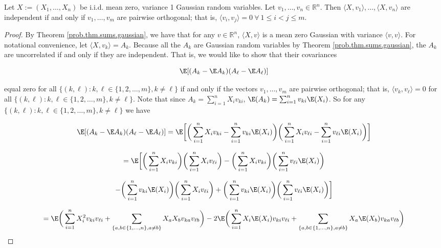 \begin{lemma}\label{stats.hw3.ex.3.16} Let \(X := (X_1, \ldots, X_n)\) be i.i.d. mean zero, variance 1 Gaussian random variables. Let \(v_1, \ldots, v_n \in \mathbb{R}^n\). Then \(\langle X, v_1 \rangle, \ldots, \langle X, v_n \rangle\) are independent if and only if \(v_1, \ldots, v_m \) are pairwise orthogonal; that is,  \(\langle v_i, v_j \rangle = 0 \ \forall \ 1 \leq i < j \leq m\). 

\end{lemma}

\begin{proof} By Theorem \ref{prob.thm.sums.gaussian}, we have that for any $v\in\mathbb{R}^{n}$, $\langle X, v\rangle$ is a mean zero Gaussian with variance $\langle v,v\rangle$. For notational convenience, let \(\langle X, v_k \rangle = A_k\). Because all the \( A_k \) are Gaussian random variables by Theorem \ref{prob.thm.sums.gaussian}, the \(A_k\) are uncorrelated if and only if they are independent. That is, we would like to show that their covariances


\[
\E[(A_k - \E A_k)(A_\ell - \E A_\ell)] 
\]

equal zero for all \( \{(k, \ell) : k, \ell \in \{1, 2, \ldots, m\}, k \neq \ell \}\) if and only if the vectors $v_1,\dots,v_m$ are pairwise orthogonal; that is, \(\langle v_k, v_\ell \rangle = 0 \) for all \( \{(k, \ell) : k, \ell \in \{1, 2, \ldots, m\}, k \neq \ell \}\). Note that since \(A_k = \sum_{i=1}^n X_i v_{ki}\), \(\E (A_k) =   \sum_{i=1}^n  v_{ki} \E(X_i)\). So for any \( \{(k, \ell) : k, \ell \in \{1, 2, \ldots, m\}, k \neq \ell \}\) we have

\[
\E[(A_k - \E A_k)(A_\ell - \E A_\ell)] = \E \bigg[ \bigg( \sum_{i=1}^n X_i v_{ki} -   \sum_{i=1}^n  v_{ki} \E(X_i) \bigg) \bigg(\sum_{i=1}^n X_i v_{\ell i} -   \sum_{i=1}^n  v_{\ell i} \E(X_i) \bigg) \bigg] 
\]

\[
= \E \bigg[ \bigg( \sum_{i=1}^n X_i v_{ki} \bigg)  \bigg(\sum_{i=1}^n X_i v_{\ell i} \bigg) -  \bigg( \sum_{i=1}^n X_i v_{ki} \bigg) \bigg( \sum_{i=1}^n  v_{\ell i} \E(X_i) \bigg)   
\]

\[
-   \bigg( \sum_{i=1}^n  v_{ki} \E(X_i) \bigg) \bigg(\sum_{i=1}^n X_i v_{\ell i} \bigg)  +    \bigg( \sum_{i=1}^n  v_{ki} \E(X_i) \bigg)  \bigg(  \sum_{i=1}^n  v_{\ell i} \E(X_i) \bigg) \bigg] 
\]




\[
= \E \bigg(  \sum_{i=1}^n X_i^2 v_{ki} v_{\ell i} + \sum_{\{a, b \in \{1, \ldots, n\}, a \neq b \} }   X_a X_b v_{ka}  v_{\ell b}\bigg)
-  2 \E \bigg(  \sum_{i=1}^n X_i \E(X_i) v_{ki} v_{\ell i} + \sum_{\{a, b \in \{1, \ldots, n\}, a \neq b\} }   X_a \E(X_b) v_{ka}  v_{\ell b} \bigg)   
\]


\end{proof}
